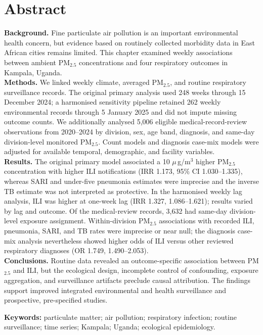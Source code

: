 \documentclass[12pt,a4paper]{report}
\newcommand{\pmfive}{PM$_{2.5}$}
\newcommand{\ugm}{\ensuremath{\mu}\,g/m$^3$}
\begin{document}
\chapter*{Abstract}
\noindent\textbf{Background.} Fine particulate air pollution is an important environmental health concern, but evidence based on routinely collected morbidity data in East African cities remains limited. This chapter examined weekly associations between ambient \pmfive{} concentrations and four respiratory outcomes in Kampala, Uganda.\\
\noindent\textbf{Methods.} We linked weekly climate, averaged \pmfive{}, and routine respiratory surveillance records. The original primary analysis used 248 weeks through 15 December 2024; a harmonised sensitivity pipeline retained 262 weekly environmental records through 5 January 2025 and did not impute missing outcome counts. We additionally analysed 5,006 eligible medical-record-review observations from 2020--2024 by division, sex, age band, diagnosis, and same-day division-level monitored \pmfive{}. Count models and diagnosis case-mix models were adjusted for available temporal, demographic, and facility variables.\\
\noindent\textbf{Results.} The original primary model associated a 10 \ugm{} higher \pmfive{} concentration with higher ILI notifications (IRR 1.173, 95\% CI 1.030--1.335), whereas SARI and under-five pneumonia estimates were imprecise and the inverse TB estimate was not interpreted as protective. In the harmonised weekly lag analysis, ILI was higher at one-week lag (IRR 1.327, 1.086--1.621); results varied by lag and outcome. Of the medical-review records, 3,632 had same-day division-level exposure assignment. Within-division \pmfive{} associations with recorded ILI, pneumonia, SARI, and TB rates were imprecise or near null; the diagnosis case-mix analysis nevertheless showed higher odds of ILI versus other reviewed respiratory diagnoses (OR 1.749, 1.490--2.053).\\
\noindent\textbf{Conclusions.} Routine data revealed an outcome-specific association between \pmfive{} and ILI, but the ecological design, incomplete control of confounding, exposure aggregation, and surveillance artifacts preclude causal attribution. The findings support improved integrated environmental and health surveillance and prospective, pre-specified studies.

\vspace{0.5cm}
\noindent\textbf{Keywords:} particulate matter; air pollution; respiratory infection; routine surveillance; time series; Kampala; Uganda; ecological epidemiology.
\end{document}
